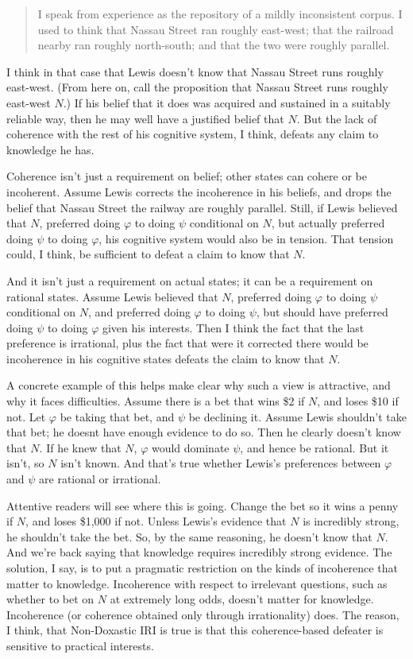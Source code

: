 \begin{quote}
I speak from experience as the repository of a mildly inconsistent corpus. I used to think that Nassau Street ran roughly east-west; that the railroad nearby ran roughly north-south; and that the two were roughly parallel. \citep[436]{Lewis1982c} 
\end{quote}

\noindent I think in that case that Lewis doesn't know that Nassau Street runs roughly east-west. (From here on, call the proposition that Nassau Street runs roughly east-west $N$.) If his belief that it does was acquired and sustained in a suitably reliable way, then he may well have a justified belief that $N$. But the lack of coherence with the rest of his cognitive system, I think, defeats any claim to knowledge he has.

Coherence isn't just a requirement on belief; other states can cohere or be incoherent. Assume Lewis corrects the incoherence in his beliefs, and drops the belief that Nassau Street the railway are roughly parallel. Still, if Lewis believed that $N$, preferred doing $\varphi$ to doing $\psi$ conditional on $N$, but actually preferred doing $\psi$ to doing $\varphi$, his cognitive system would also be in tension. That tension could, I think, be sufficient to defeat a claim to know that $N$.

And it isn't just a requirement on actual states; it can be a requirement on rational states. Assume Lewis believed that $N$, preferred doing $\varphi$ to doing $\psi$ conditional on $N$, and preferred doing $\varphi$ to doing $\psi$, but should have preferred doing $\psi$ to doing $\varphi$ given his interests. Then I think the fact that the last preference is irrational, plus the fact that were it corrected there would be incoherence in his cognitive states defeats the claim to know that $N$.

A concrete example of this helps make clear why such a view is attractive, and why it faces difficulties. Assume there is a bet that wins \$2 if $N$, and loses \$10 if not. Let $\varphi$ be taking that bet, and $\psi$ be declining it. Assume Lewis shouldn't take that bet; he doesnt have enough evidence to do so. Then he clearly doesn't know that $N$. If he knew that $N$, $\varphi$ would dominate $\psi$, and hence be rational. But it isn't, so $N$ isn't known. And that's true whether Lewis's preferences between $\varphi$ and $\psi$ are rational or irrational.

Attentive readers will see where this is going. Change the bet so it wins a penny if $N$, and loses \$1,000 if not. Unless Lewis's evidence that $N$ is incredibly strong, he shouldn't take the bet. So, by the same reasoning, he doesn't know that $N$. And we're back saying that knowledge requires incredibly strong evidence. The solution, I say, is to put a pragmatic restriction on the kinds of incoherence that matter to knowledge. Incoherence with respect to irrelevant questions, such as whether to bet on $N$ at extremely long odds, doesn't matter for knowledge. Incoherence (or coherence obtained only through irrationality) does. The reason, I think, that Non-Doxastic IRI is true is that this coherence-based defeater is sensitive to practical interests.

